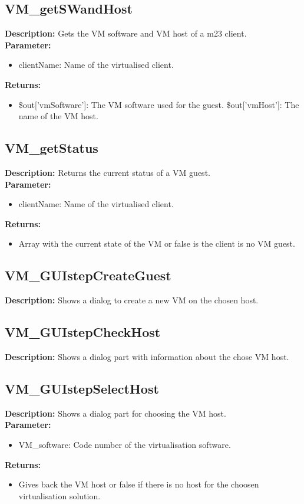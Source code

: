 \subsection{VM\_getSWandHost}
\textbf{Description:} Gets the VM software and VM host of a m23 client.\\
\textbf{Parameter:}
\begin{itemize}
\item clientName: Name of the virtualised client.
\end{itemize}
\textbf{Returns:}
\begin{itemize}
\item \$out['vmSoftware']: The VM software used for the guest. \$out['vmHost']: The name of the VM host.
\end{itemize}

\subsection{VM\_getStatus}
\textbf{Description:} Returns the current status of a VM guest.\\
\textbf{Parameter:}
\begin{itemize}
\item clientName: Name of the virtualised client.
\end{itemize}
\textbf{Returns:}
\begin{itemize}
\item Array with the current state of the VM or false is the client is no VM guest.
\end{itemize}

\subsection{VM\_GUIstepCreateGuest}
\textbf{Description:} Shows a dialog to create a new VM on the chosen host.\\

\subsection{VM\_GUIstepCheckHost}
\textbf{Description:} Shows a dialog part with information about the chose VM host.\\

\subsection{VM\_GUIstepSelectHost}
\textbf{Description:} Shows a dialog part for choosing the VM host.\\
\textbf{Parameter:}
\begin{itemize}
\item VM\_software: Code number of the virtualisation software.
\end{itemize}
\textbf{Returns:}
\begin{itemize}
\item Gives back the VM host or false if there is no host for the choosen virtualisation solution.
\end{itemize}

